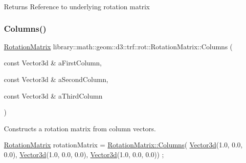 \begin{DoxyReturn}{Returns}
Reference to underlying rotation matrix 
\end{DoxyReturn}
\mbox{\label{classlibrary_1_1math_1_1geom_1_1d3_1_1trf_1_1rot_1_1_rotation_matrix_a73c73c91145a6b543801f41286f4a517}} 
\subsubsection{\texorpdfstring{Columns()}{Columns()}}
{\footnotesize\ttfamily \hyperlink{classlibrary_1_1math_1_1geom_1_1d3_1_1trf_1_1rot_1_1_rotation_matrix}{Rotation\+Matrix} library\+::math\+::geom\+::d3\+::trf\+::rot\+::\+Rotation\+Matrix\+::\+Columns (\begin{DoxyParamCaption}\item[{const Vector3d \&}]{a\+First\+Column,  }\item[{const Vector3d \&}]{a\+Second\+Column,  }\item[{const Vector3d \&}]{a\+Third\+Column }\end{DoxyParamCaption})\hspace{0.3cm}{\ttfamily [static]}}



Constructs a rotation matrix from column vectors. 


\begin{DoxyCode}
\hyperlink{classlibrary_1_1math_1_1geom_1_1d3_1_1trf_1_1rot_1_1_rotation_matrix_a7f1184694020cb4f963d58931324ab06}{RotationMatrix} rotationMatrix = \hyperlink{classlibrary_1_1math_1_1geom_1_1d3_1_1trf_1_1rot_1_1_rotation_matrix_a73c73c91145a6b543801f41286f4a517}{RotationMatrix::Columns}(
      \hyperlink{namespacelibrary_1_1math_1_1obj_a977e84e9bf317a4e7dd9d6d671d6da2f}{Vector3d}(1.0, 0.0, 0.0), \hyperlink{namespacelibrary_1_1math_1_1obj_a977e84e9bf317a4e7dd9d6d671d6da2f}{Vector3d}(1.0, 0.0, 0.0), \hyperlink{namespacelibrary_1_1math_1_1obj_a977e84e9bf317a4e7dd9d6d671d6da2f}{Vector3d}(1.0, 0.0, 0.0)) ;
\end{DoxyCode}



